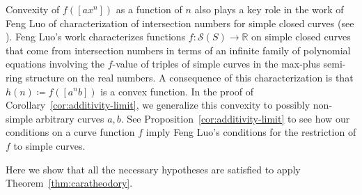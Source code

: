 \begin{remark}
Convexity of $f([ax^n])$ as a function of $n$ also plays a key role in the work of Feng Luo of characterization of intersection numbers for simple closed curves (see \cite[Corollary~4.4]{Luo98:IntersectionNumbers}).
Feng Luo's work characterizes functions $f \colon \mathcal{S}(S) \to \mathbb{R}$ on simple closed curves that come from intersection numbers in terms of an infinite family of polynomial equations involving the $f$-value of triples of simple curves in the max-plus semi-ring structure on the real numbers.
A consequence of this characterization is that $h(n) \coloneqq f([a^n b])$ is a convex function.
In the proof of Corollary~\ref{cor:additivity-limit}, we generalize this convexity to possibly non-simple arbitrary curves $a,b$. See Proposition~\ref{cor:additivity-limit} to see how our conditions on a curve function $f$ imply Feng Luo's conditions for the restriction of $f$ to simple curves.
\end{remark}

 Here we show that all the necessary hypotheses are satisfied to apply Theorem~\ref{thm:caratheodory}.

